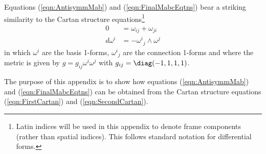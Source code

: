 \documentclass[a4paper,12pt]{article}
\numberwithin{equation}{section}
\begin{document}
Equations (\ref{eqn:AntisymmMab}) and (\ref{eqn:FinalMabcEqtns}) bear a striking similarity
to the Cartan structure equations\footnote{Latin indices will be used in this appendix to
denote frame components (rather than spatial indices). This follows standard notation for
differential forms.}
\begin{align}
   0 &= \omega_{ij} + \omega_{ji}\label{eqn:FirstCartan}\\
   d\omega^i &= - \omega^i{}_j \wedge \omega^j\label{eqn:SecondCartan}
\end{align}
in which $\omega^i$ are the basis 1-forms, $\omega^i{}_j$ are the connection 1-forms and
where the metric is given by $g = g_{ij} \omega^i \omega^j$ with $g_{ij} = \diag (-1,1,1,1)$.

The purpose of this appendix is to show how equations (\ref{eqn:AntisymmMab}) and
(\ref{eqn:FinalMabcEqtns}) can be obtained from the Cartan structure equations
(\ref{eqn:FirstCartan}) and (\ref{eqn:SecondCartan}).
\end{document}

